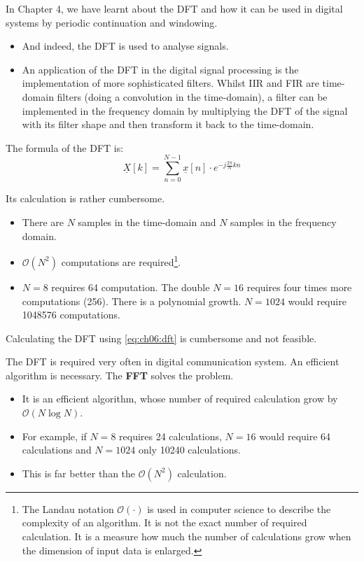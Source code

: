 \begin{refsection}
In Chapter 4, we have learnt about the \ac{DFT} and how it can be used in digital systems by periodic continuation and windowing. 
\begin{itemize}
	\item And indeed, the \ac{DFT} is used to analyse signals.
	\item An application of the \ac{DFT} in the digital signal processing is the implementation of more sophisticated filters. Whilst \ac{IIR} and \ac{FIR} are time-domain filters (doing a convolution in the time-domain), a filter can be implemented in the frequency domain by multiplying the \ac{DFT} of the signal with its filter shape and then transform it back to the time-domain.
\end{itemize}

The formula of the \ac{DFT} is:
\begin{equation}
	\underline{X}[k] = \sum\limits_{n = 0}^{N - 1} \underline{x}[n] \cdot e^{- j \frac{2 \pi}{N} k n}
	\label{eq:ch06:dft}
\end{equation}

Its calculation is rather cumbersome.
\begin{itemize}
	\item There are $N$ samples in the time-domain and $N$ samples in the frequency domain. 
	\item $\mathcal{O}\left(N^2\right)$ computations are required\footnote{The Landau notation $\mathcal{O}\left(\cdot\right)$ is used in computer science to describe the complexity of an algorithm. It is not the exact number of required calculation. It is a measure how much the number of calculations grow when the dimension of input data is enlarged.}.
	\item $N = 8$ requires \num{64} computation. The double $N=16$ requires four times more computations (\num{256}). There is a polynomial growth. $N = 1024$ would require \num{1048576} computations.
\end{itemize}

\begin{fact}
	Calculating the \ac{DFT} using \eqref{eq:ch06:dft} is cumbersome and not feasible.
\end{fact}

The \ac{DFT} is required very often in digital communication system. An efficient algorithm is necessary. The  \textbf{\acf{FFT}} solves the problem.
\begin{itemize}
	\item It is an efficient algorithm, whose number of required calculation grow by $\mathcal{O}\left(N \log N\right)$.
	\item For example, if $N=8$ requires \num{24} calculations, $N=16$ would require \num{64} calculations and $N = 1024$ only \num{10240} calculations.
	\item This is far better than the $\mathcal{O}\left(N^2\right)$ calculation.
\end{itemize}


\end{refsection}
